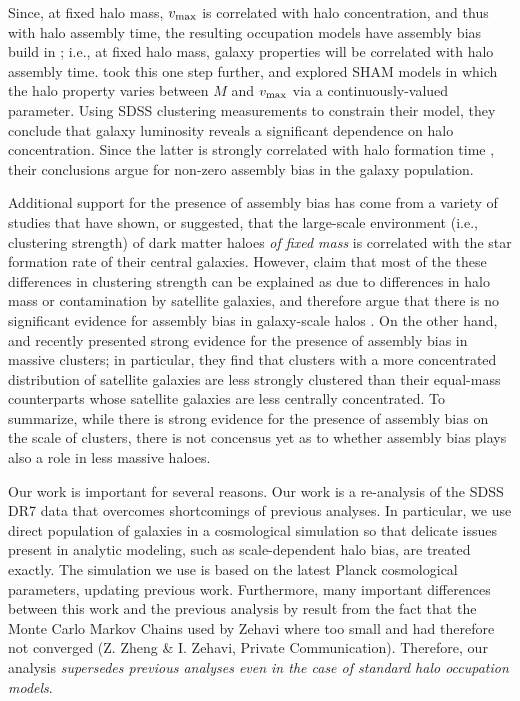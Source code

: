 \documentclass[usenatbib,usegraphicx,letterpaper]{mn2e}
\newcommand{\vmax}{v_{\rm max}}
\begin{document}
Since, at fixed halo mass, $\vmax$ is correlated with halo
concentration, and thus with halo assembly time, the resulting
occupation models have assembly bias build in
\citep[see][]{Zentner_etal14}; i.e., at fixed halo mass, galaxy
properties will be correlated with halo assembly
time. \citet{lehmann_etal15} took this one step further, and explored
SHAM models in which the halo property varies between $M$ and $\vmax$
via a continuously-valued parameter. Using SDSS clustering
measurements to constrain their model, they conclude that galaxy
luminosity reveals a significant dependence on halo
concentration. Since the latter is strongly correlated with halo
formation time \citep[e.g.,][]{wechsler02,zhao_etal09,ludlow_etal13},
their conclusions argue for non-zero assembly bias in the galaxy
population.

Additional support for the presence of assembly bias has come from a
variety of studies that have shown, or suggested, that the large-scale
environment (i.e., clustering strength) of dark matter haloes {\it of
  fixed mass} is correlated with the star formation rate of their
central
galaxies\citep[][]{yang_etal06a,blanton_berlind07,wang_etal08,tinker_etal12,wang_etal13,HW13a,hearin_etal13b,hearin_etal14,watson_etal14}.
However, \citet{lin_mandelbaum_etal15} claim that most of the these
differences in clustering strength can be explained as due to
differences in halo mass or contamination by satellite galaxies, and
therefore argue that there is no significant evidence for assembly
bias in galaxy-scale halos \citep[see also][]{paranjape15}.  On the
other hand, \citet{miyatake_etal15} and \citet{more_etal16} recently
presented strong evidence for the presence of assembly bias in massive
clusters; in particular, they find that clusters with a more
concentrated distribution of satellite galaxies are less strongly
clustered than their equal-mass counterparts whose satellite galaxies
are less centrally concentrated. To summarize, while there is strong
evidence for the presence of assembly bias on the scale of clusters,
there is not concensus yet as to whether assembly bias plays also a
role in less massive haloes.

Our work is important for several reasons. Our work is a re-analysis
of the SDSS DR7 data that overcomes shortcomings of previous
analyses. In particular, we use direct population of galaxies in a
cosmological simulation so that delicate issues present in analytic
modeling, such as scale-dependent halo bias, are treated exactly.  The
simulation we use is based on the latest Planck cosmological
parameters, updating previous work. Furthermore, many important
differences between this work and the previous analysis by
\citet{zehavi_etal11} result from the fact that the Monte Carlo Markov
Chains used by Zehavi \etal where too small and had therefore not
converged (Z. Zheng \& I. Zehavi, Private Communication).  Therefore,
our analysis {\em supersedes previous analyses even in the case of
  standard halo occupation models}.
\end{document}
